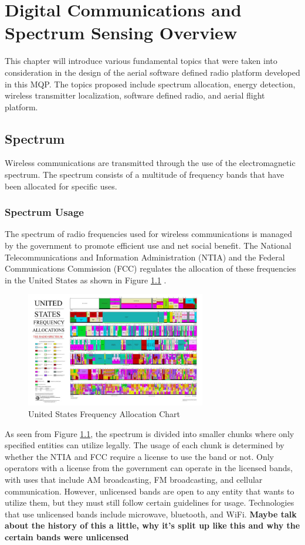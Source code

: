 \chapter{Digital Communications and Spectrum Sensing Overview}
This chapter will introduce various fundamental topics that were taken into consideration in the design of the aerial software defined radio platform developed in this MQP. The topics proposed include spectrum allocation, energy detection, wireless transmitter localization, software defined radio, and aerial flight platform.

\section{Spectrum}
Wireless communications are transmitted through the use of the electromagnetic spectrum. The spectrum consists of a multitude of frequency bands that have been allocated for specific uses.

\subsection{Spectrum Usage}
The spectrum of radio frequencies used for wireless communications is managed by the government to promote efficient use and net social benefit. The National Telecommunications and Information Administration (NTIA) and the Federal Communications Commission (FCC) regulates the allocation of these frequencies in the United States as shown in Figure \ref{fig:freq_chart} \cite{FCC_Info}. 
\begin{figure}[ht]
\centering
\includegraphics[width=0.70\textwidth]{img/the_radio_spectrum.jpg}
\caption{United States Frequency Allocation Chart \cite{FCC_Info}}
\label{fig:freq_chart}
\end{figure}
As seen from Figure \ref{fig:freq_chart}, the spectrum is divided into smaller chunks where only specified entities can utilize legally. The usage of each chunk is determined by whether the NTIA and FCC require a license to use the band or not. Only operators with a license from the government can operate in the licensed bands, with uses that include AM broadcasting, FM broadcasting, and cellular communication. However, unlicensed bands are open to any entity that wants to utilize them, but they must still follow certain guidelines for usage. Technologies that use unlicensed bands include microwave, bluetooth, and WiFi. \textbf{Maybe talk about the history of this a little, why it's split up like this and why the certain bands were unlicensed}

